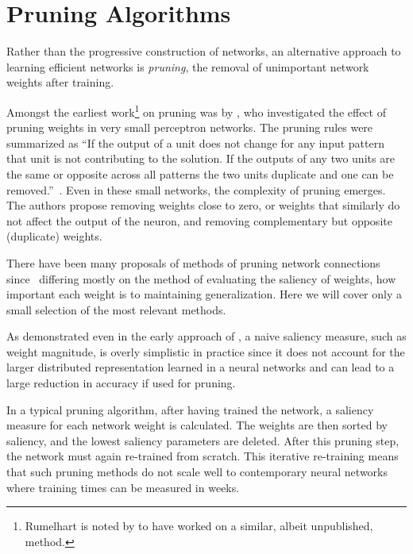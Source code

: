 \documentclass[thesis]{subfiles}
\begin{document}
	\section{Pruning Algorithms}
	Rather than the progressive construction of networks, an alternative approach to learning efficient networks is \emph{pruning}, the removal of unimportant network weights after training.

	Amongst the earliest work\footnote{Rumelhart is noted by \citet{hanson1989comparing} to have worked on a similar, albeit unpublished, method.} on pruning was by \citeauthor{sietsma1988neural}, who investigated the effect of pruning weights in very small perceptron networks. The pruning rules were summarized as ``If the output of a unit does not change for any input pattern that unit is not contributing to the solution. If the outputs of any two units are the same or opposite across all patterns the two units duplicate and one can be removed.''~\citep{sietsma1988neural}. Even in these small networks, the complexity of pruning emerges. The authors propose removing weights close to zero, or weights that similarly do not affect the output of the neuron, and removing complementary but opposite (\ie{}duplicate) weights. %
	
	There have been many proposals of methods of pruning network connections since~\citep{hanson1989comparing, lecun1989optimal, mozer1989using, mozer1989skeletonization, gorodkin1993quantitative, setiono1997penalty,castellano1997iterative,han2015learning,han2015deep,han2016dsd,ullrich2017soft,} differing mostly on the method of evaluating the saliency of weights, \ie how important each weight is to maintaining generalization.  Here we will cover only a small selection of the most relevant methods.

	As demonstrated even in the early approach of \citeauthor{sietsma1988neural}, a naive saliency measure, such as weight magnitude, is overly simplistic in practice since it does not account for the larger distributed representation learned in a neural networks and can lead to a large reduction in accuracy if used for pruning.

    In a typical pruning algorithm, after having trained the network, a saliency measure for each network weight is calculated. The weights are then sorted by saliency, and the lowest saliency parameters are deleted. After this pruning step, the network must again re-trained from scratch. This iterative re-training means that such pruning methods do not scale well to contemporary neural networks where training times can be measured in weeks.
\end{document}
